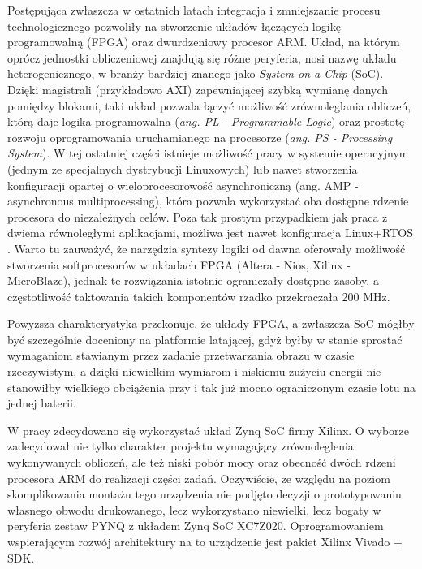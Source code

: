 Postępująca zwłaszcza w ostatnich latach integracja i zmniejszanie procesu technologicznego pozwoliły na stworzenie układów łączących logikę programowalną (FPGA) oraz dwurdzeniowy procesor ARM. 
Układ, na którym oprócz jednostki obliczeniowej znajdują się różne peryferia, nosi nazwę układu heterogenicznego, w branży bardziej znanego jako \textit{System on a Chip} (SoC). %
Dzięki magistrali (przykładowo AXI) zapewniającej szybką wymianę danych pomiędzy blokami, taki układ pozwala łączyć możliwość zrównoleglania obliczeń, którą daje logika programowalna (\textit{ang. PL - Programmable Logic}) oraz prostotę rozwoju oprogramowania uruchamianego na procesorze (\textit{ang. PS - Processing System}). 
W tej ostatniej części istnieje możliwość pracy w systemie operacyjnym (jednym ze specjalnych dystrybucji Linuxowych) lub nawet stworzenia konfiguracji opartej o wieloprocesorowość asynchroniczną (ang. AMP - asynchronous multiprocessing), która pozwala wykorzystać oba dostępne rdzenie procesora do niezależnych celów. Poza tak prostym przypadkiem jak praca z dwiema równoległymi aplikacjami, możliwa jest nawet konfiguracja Linux+RTOS \cite{AMP}. %
Warto tu zauważyć, że narzędzia syntezy logiki od dawna oferowały możliwość stworzenia softprocesorów w układach FPGA (Altera - Nios, Xilinx - MicroBlaze), jednak te rozwiązania istotnie ograniczały dostępne zasoby, a częstotliwość taktowania takich komponentów rzadko przekraczała 200 MHz. 

Powyższa charakterystyka przekonuje, że układy FPGA, a zwłaszcza SoC mógłby być szczególnie doceniony na platformie latającej, gdyż byłby w stanie sprostać wymaganiom stawianym przez zadanie przetwarzania obrazu w czasie rzeczywistym, a dzięki niewielkim wymiarom i niskiemu zużyciu energii nie stanowiłby wielkiego obciążenia przy i tak już mocno ograniczonym czasie lotu na jednej baterii. 

W pracy zdecydowano się wykorzystać układ Zynq SoC firmy Xilinx. O wyborze zadecydował nie tylko charakter projektu wymagający zrównoleglenia wykonywanych obliczeń, ale też niski pobór mocy oraz obecność dwóch rdzeni procesora ARM do realizacji części zadań.%
Oczywiście, ze względu na poziom skomplikowania montażu tego urządzenia nie podjęto decyzji o prototypowaniu własnego obwodu drukowanego, lecz wykorzystano niewielki, lecz bogaty w peryferia zestaw PYNQ z układem Zynq SoC XC7Z020. Oprogramowaniem wspierającym rozwój architektury na to urządzenie jest pakiet Xilinx Vivado + SDK.

